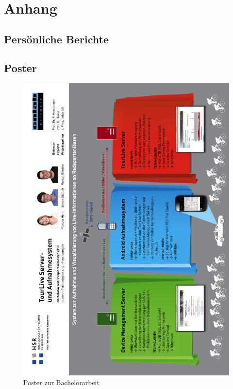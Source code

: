 \chapter{Anhang}






\section{Persönliche Berichte}
















\section{Poster}
\begin{figure}[H]
	\centering
	\includegraphics[width=130mm]{images/TourLive_Poster.png}
	\caption{Poster zur Bachelorarbeit}
\end{figure}


